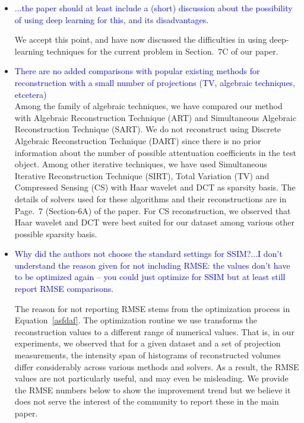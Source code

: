 \documentclass{article}
\begin{document}
 \begin{itemize}
 \item    \textcolor{blue}{...the paper should at least include a (short) discussion about the
     possibility of using deep learning for this, and its disadvantages.}

   We accept this point, and have now discussed the difficulties in
   using deep-learning techniques for the current problem in Section.~7C
   of our paper. 

\item \textcolor{blue}{There are no added comparisons with popular existing methods for
  reconstruction with a small number of projections (TV, algebraic techniques, etcetera)}\\
  
 Among the family of algebraic techniques, we have compared our method
 with Algebraic Reconstruction Technique (ART) and Simultaneous
 Algebraic Reconstruction Technique (SART). We do not reconstruct
 using Discrete Algebraic Reconstruction Technique (DART) since there
 is no prior information about the number of possible attentuation
 coefficients in the test object.
 Among other iterative techniques, we
 have used Simultaneous Iterative Reconstruction Technique (SIRT),
 Total Variation (TV) and Compressed Sensing (CS) with Haar wavelet
 and DCT as sparsity basis. The details of solvers used for these
 algorithms and their reconstructions are in Page.~7 (Section-6A) of
 the paper. For CS reconstruction, we observed that Haar wavelet and
 DCT were best suited for our dataset among various other possible
 sparsity basis.

\item \textcolor{blue}{Why did the authors not choose the standard
  settings for SSIM?...I don’t understand the reason given for not
  including RMSE: the values don’t have to be optimized again -- you
  could just optimize for SSIM but at least still report RMSE
  comparisons.}

  The reason for not reporting RMSE stems from the optimization
  process in Equation~\ref{asfdaf}. The optimization routine we use
  transforms the reconstruction values to a different range of
  numerical values.  That is, in our experiments, we observed that for
  a given dataset and a set of projection measurements, the intensity
  span of histograms of reconstructed volumes differ considerably across various
  methods and solvers.  As a result, the RMSE values are not
  particularly useful, and may even be misleading.  We provide the RMSE numbers below to show the
  improvement trend but we believe it does not serve the interest of
  the community to report these in the main paper.


\end{itemize}
\end{document}
